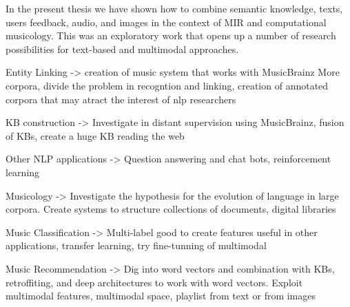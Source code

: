 In the present thesis we have shown how to combine semantic knowledge, texts, users feedback, audio, and images in the context of MIR and computational musicology. This was an exploratory work that opens up a number of research possibilities for text-based and multimodal approaches.

Entity Linking -> creation of music system that works with MusicBrainz
More corpora, divide the problem in recogntion and linking, creation of annotated corpora that may atract the interest of nlp researchers

KB construction -> Investigate in distant supervision using MusicBrainz, fusion of KBs, create a huge KB reading the web

Other NLP applications -> Question answering and chat bots, reinforcement learning

Musicology -> Investigate the hypothesis for the evolution of language in large corpora. Create systems to structure collections of documents, digital libraries

Music Classification -> Multi-label good to create features useful in other applications, transfer learning, try fine-tunning of multimodal

Music Recommendation -> Dig into word vectors and combination with KBs, retroffiting, and deep architectures to work with word vectors. Exploit multimodal features, multimodal space, playlist from text or from images

